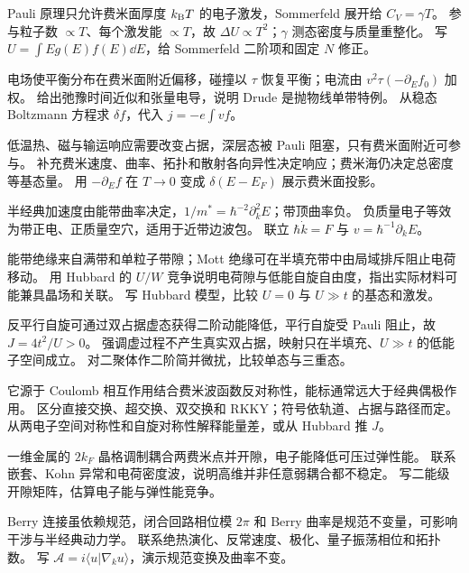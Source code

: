 {Pauli 原理只允许费米面厚度 $k_{\mathrm B} T$ 的电子激发，Sommerfeld 展开给 $C_V=\gamma T$。}
{参与粒子数 $\propto T$、每个激发能 $\propto T$，故 $\Delta U\propto T^2$；$\gamma$ 测态密度与质量重整化。}
{写 $U=\int Eg(E)f(E)\dd E$，给 Sommerfeld 二阶项和固定 $N$ 修正。}

{电场使平衡分布在费米面附近偏移，碰撞以 $\tau$ 恢复平衡；电流由 $v^2\tau(-\partial_Ef_0)$ 加权。}
{给出弛豫时间近似和张量电导，说明 Drude 是抛物线单带特例。}
{从稳态 Boltzmann 方程求 $\delta f$，代入 $j=-e\int v f$。}

{低温热、磁与输运响应需要改变占据，深层态被 Pauli 阻塞，只有费米面附近可参与。}
{补充费米速度、曲率、拓扑和散射各向异性决定响应；费米海仍决定总密度等基态量。}
{用 $-\partial_Ef$ 在 $T\to0$ 变成 $\delta(E-E_F)$ 展示费米面投影。}

{半经典加速度由能带曲率决定，$1/m^*=\hbar^{-2}\partial_k^2E$；带顶曲率负。}
{负质量电子等效为带正电、正质量空穴，适用于近带边波包。}
{联立 $\hbar\dot k=F$ 与 $v=\hbar^{-1}\partial_kE$。}

{能带绝缘来自满带和单粒子带隙；Mott 绝缘可在半填充带中由局域排斥阻止电荷移动。}
{用 Hubbard 的 $U/W$ 竞争说明电荷隙与低能自旋自由度，指出实际材料可能兼具晶场和关联。}
{写 Hubbard 模型，比较 $U=0$ 与 $U\gg t$ 的基态和激发。}

{反平行自旋可通过双占据虚态获得二阶动能降低，平行自旋受 Pauli 阻止，故 $J=4t^2/U>0$。}
{强调虚过程不产生真实双占据，映射只在半填充、$U\gg t$ 的低能子空间成立。}
{对二聚体作二阶简并微扰，比较单态与三重态。}

{它源于 Coulomb 相互作用结合费米波函数反对称性，能标通常远大于经典偶极作用。}
{区分直接交换、超交换、双交换和 RKKY；符号依轨道、占据与路径而定。}
{从两电子空间对称性和自旋对称性解释能量差，或从 Hubbard 推 $J$。}

{一维金属的 $2k_F$ 晶格调制耦合两费米点并开隙，电子能降低可压过弹性能。}
{联系嵌套、Kohn 异常和电荷密度波，说明高维并非任意弱耦合都不稳定。}
{写二能级开隙矩阵，估算电子能与弹性能竞争。}

{Berry 连接虽依赖规范，闭合回路相位模 $2\pi$ 和 Berry 曲率是规范不变量，可影响干涉与半经典动力学。}
{联系绝热演化、反常速度、极化、量子振荡相位和拓扑数。}
{写 $\mathcal A=i\langle u|\nabla_k u\rangle$，演示规范变换及曲率不变。}

